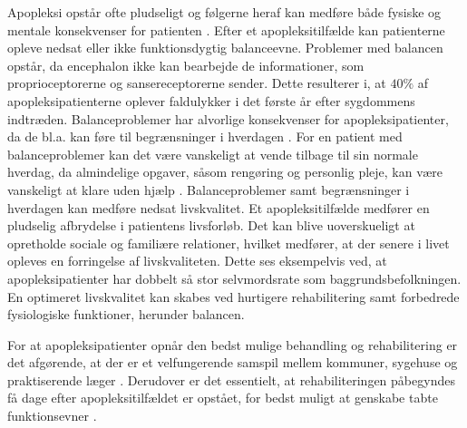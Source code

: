 Apopleksi opstår ofte pludseligt og følgerne heraf kan medføre både fysiske og mentale konsekvenser for patienten \cite{Muus2008}. Efter et apopleksitilfælde kan patienterne opleve nedsat eller ikke funktionsdygtig balanceevne. Problemer med balancen opstår, da encephalon ikke kan bearbejde de informationer, som proprioceptorerne og sansereceptorerne sender. \cite{Karnath2003} Dette resulterer i, at $40\%$ af apopleksipatienterne oplever faldulykker i det første år efter sygdommens indtræden. \cite{Association2006} 
Balanceproblemer har alvorlige konsekvenser for apopleksipatienter, da de bl.a. kan føre til begrænsninger i hverdagen \cite{Muus2008,Nichols1997}. For en patient med balanceproblemer kan det være vanskeligt at vende tilbage til sin normale hverdag, da almindelige opgaver, såsom rengøring og personlig pleje, kan være vanskeligt at klare uden hjælp \cite{Sundhedsstyrelsen2010}. Balanceproblemer samt begrænsninger i hverdagen kan medføre nedsat livskvalitet. Et apopleksitilfælde medfører en pludselig afbrydelse i patientens livsforløb. Det kan blive uoverskueligt at opretholde sociale og familiære relationer, hvilket medfører, at der senere i livet opleves en forringelse af livskvaliteten. Dette ses eksempelvis ved, at apopleksipatienter har dobbelt så stor selvmordsrate som baggrundsbefolkningen. \cite{Sundhedsstyrelsen2010} En optimeret livskvalitet kan skabes ved hurtigere rehabilitering samt forbedrede fysiologiske funktioner, herunder balancen. \cite{Sundhedsstyrelsen2010}

For at apopleksipatienter opnår den bedst mulige behandling og rehabilitering er det afgørende, at der er et velfungerende samspil mellem kommuner, sygehuse og praktiserende læger \cite{Sundhedsstyrelsen2010}. Derudover er det essentielt, at rehabiliteringen påbegyndes få dage efter apopleksitilfældet er opstået, for bedst muligt at genskabe tabte funktionsevner \cite{Kruuse2015}. 



